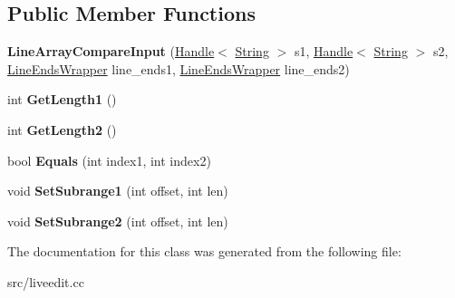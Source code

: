 \subsection*{Public Member Functions}
\begin{DoxyCompactItemize}
\item 
\hypertarget{classv8_1_1internal_1_1_line_array_compare_input_a81e0a329fa03d7221f1d62032b72c8b2}{}{\bfseries Line\+Array\+Compare\+Input} (\hyperlink{classv8_1_1internal_1_1_handle}{Handle}$<$ \hyperlink{classv8_1_1internal_1_1_string}{String} $>$ s1, \hyperlink{classv8_1_1internal_1_1_handle}{Handle}$<$ \hyperlink{classv8_1_1internal_1_1_string}{String} $>$ s2, \hyperlink{classv8_1_1internal_1_1_line_ends_wrapper}{Line\+Ends\+Wrapper} line\+\_\+ends1, \hyperlink{classv8_1_1internal_1_1_line_ends_wrapper}{Line\+Ends\+Wrapper} line\+\_\+ends2)\label{classv8_1_1internal_1_1_line_array_compare_input_a81e0a329fa03d7221f1d62032b72c8b2}

\item 
\hypertarget{classv8_1_1internal_1_1_line_array_compare_input_a34899c15164a56952bc71f6c2a70c977}{}int {\bfseries Get\+Length1} ()\label{classv8_1_1internal_1_1_line_array_compare_input_a34899c15164a56952bc71f6c2a70c977}

\item 
\hypertarget{classv8_1_1internal_1_1_line_array_compare_input_acd0d510eb2b4ef21069996e8659b5b38}{}int {\bfseries Get\+Length2} ()\label{classv8_1_1internal_1_1_line_array_compare_input_acd0d510eb2b4ef21069996e8659b5b38}

\item 
\hypertarget{classv8_1_1internal_1_1_line_array_compare_input_a15487bb63d0cd600659652742a62c6fc}{}bool {\bfseries Equals} (int index1, int index2)\label{classv8_1_1internal_1_1_line_array_compare_input_a15487bb63d0cd600659652742a62c6fc}

\item 
\hypertarget{classv8_1_1internal_1_1_line_array_compare_input_ad439fe77f7496b6841215f86dbae6fa0}{}void {\bfseries Set\+Subrange1} (int offset, int len)\label{classv8_1_1internal_1_1_line_array_compare_input_ad439fe77f7496b6841215f86dbae6fa0}

\item 
\hypertarget{classv8_1_1internal_1_1_line_array_compare_input_ae1d51f90c06cdf61db6daf4db509e178}{}void {\bfseries Set\+Subrange2} (int offset, int len)\label{classv8_1_1internal_1_1_line_array_compare_input_ae1d51f90c06cdf61db6daf4db509e178}

\end{DoxyCompactItemize}


The documentation for this class was generated from the following file\+:\begin{DoxyCompactItemize}
\item 
src/liveedit.\+cc\end{DoxyCompactItemize}
